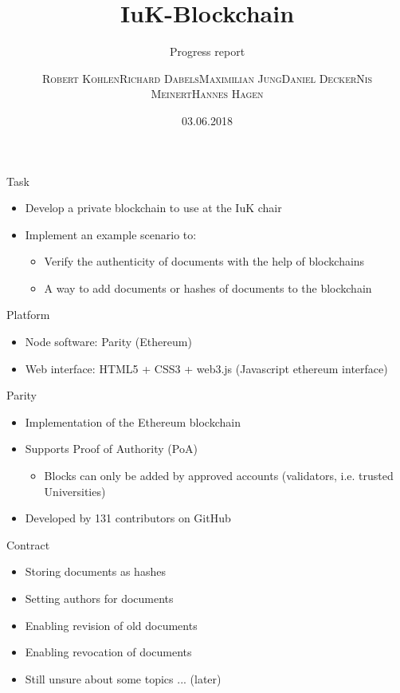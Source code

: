 \documentclass[10pt]{beamer}
\title{IuK-Blockchain}
\subtitle{Progress report}
\author{\textsc{Robert Kohlen}\newline\textsc{Richard Dabels}\newline\textsc{Maximilian Jung}\newline\textsc{Daniel Decker}\newline\textsc{Nis Meinert}\newline\textsc{Hannes Hagen}}
\date{03.06.2018}
\begin{document}
\begin{frame}
	\titlepage
\end{frame}

\begin{frame}{Task}
	\begin{itemize}
		\item Develop a private blockchain to use at the IuK chair
		\item Implement an example scenario to:
		\begin{itemize}
			\item Verify the authenticity of documents with the help of blockchains
			\item A way to add documents or hashes of documents to the blockchain
		\end{itemize}
	\end{itemize}
\end{frame}

\begin{frame}{Platform}
	\begin{itemize}
		\item Node software: Parity (Ethereum)
		\item Web interface: HTML5 + CSS3 + web3.js (Javascript ethereum interface)
	\end{itemize}
\end{frame}

\begin{frame}{Parity}
	\begin{itemize}
		\item Implementation of the Ethereum blockchain
		\item Supports Proof of Authority (PoA)
		\begin{itemize}
			\item Blocks can only be added by approved accounts (validators, i.e. trusted Universities)
		\end{itemize}
		\item Developed by 131 contributors on GitHub
	\end{itemize}
\end{frame}

\begin{frame}{Contract}
	\begin{itemize}
		\item Storing documents as hashes
		\item Setting authors for documents
		\item Enabling revision of old documents
		\item Enabling revocation of documents
		\item Still unsure about some topics ... (later)
	\end{itemize}
\end{frame}
\end{document}
